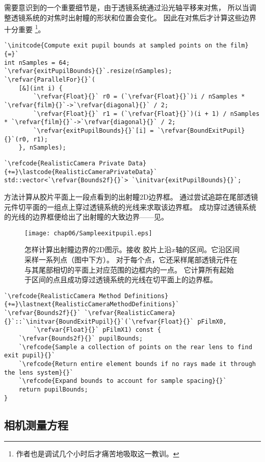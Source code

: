 需要意识到的一个重要细节是，由于透镜系统通过沿光轴平移来对焦，
所以当调整透镜系统的对焦时出射瞳的形状和位置会变化。
因此在对焦后才计算这些边界十分重要
\footnote{作者也是调试几个小时后才痛苦地吸取这一教训。}。
\begin{lstlisting}
`\initcode{Compute exit pupil bounds at sampled points on the film}{=}`
int nSamples = 64;
`\refvar{exitPupilBounds}{}`.resize(nSamples);
`\refvar{ParallelFor}{}`(
    [&](int i) {
        `\refvar{Float}{}` r0 = (`\refvar{Float}{}`)i / nSamples * `\refvar{film}{}`->`\refvar{diagonal}{}` / 2;
        `\refvar{Float}{}` r1 = (`\refvar{Float}{}`)(i + 1) / nSamples * `\refvar{film}{}`->`\refvar{diagonal}{}` / 2;
        `\refvar{exitPupilBounds}{}`[i] = `\refvar{BoundExitPupil}{}`(r0, r1);
    }, nSamples);
\end{lstlisting}
\begin{lstlisting}
`\refcode{RealisticCamera Private Data}{+=}\lastcode{RealisticCameraPrivateData}`
std::vector<`\refvar{Bounds2f}{}`> `\initvar{exitPupilBounds}{}`;
\end{lstlisting}

方法计算从胶片平面上一段点看到的出射瞳2D边界框。
通过尝试追踪在尾部透镜元件切平面的一组点上穿过透镜系统的光线来求取该边界框。
成功穿过透镜系统的光线的边界框便给出了出射瞳的大致边界——见。
\begin{figure}[htbp]
    \centering\texttt{[image: chap06/Sampleexitpupil.eps]}
    \caption{怎样计算出射瞳边界的2D图示。接收
        胶片上沿$x$轴的区间。它沿区间采样一系列点（图中下方）。
        对于每个点，它还采样尾部透镜元件在与其尾部相切的平面上对应范围的边框内的一点。
        它计算所有起始于区间的点且成功穿过透镜系统的光线在切平面上的边界框。}
    \label{fig:6.23}
\end{figure}
\begin{lstlisting}
`\refcode{RealisticCamera Method Definitions}{+=}\lastnext{RealisticCameraMethodDefinitions}`
`\refvar{Bounds2f}{}` `\refvar{RealisticCamera}{}`::`\initvar{BoundExitPupil}{}`(`\refvar{Float}{}` pFilmX0,
        `\refvar{Float}{}` pFilmX1) const {
    `\refvar{Bounds2f}{}` pupilBounds;
    `\refcode{Sample a collection of points on the rear lens to find exit pupil}{}`
    `\refcode{Return entire element bounds if no rays made it through the lens system}{}`
    `\refcode{Expand bounds to account for sample spacing}{}`
    return pupilBounds;
}
\end{lstlisting}


\subsection{相机测量方程}\label{sub:相机测量方程}
